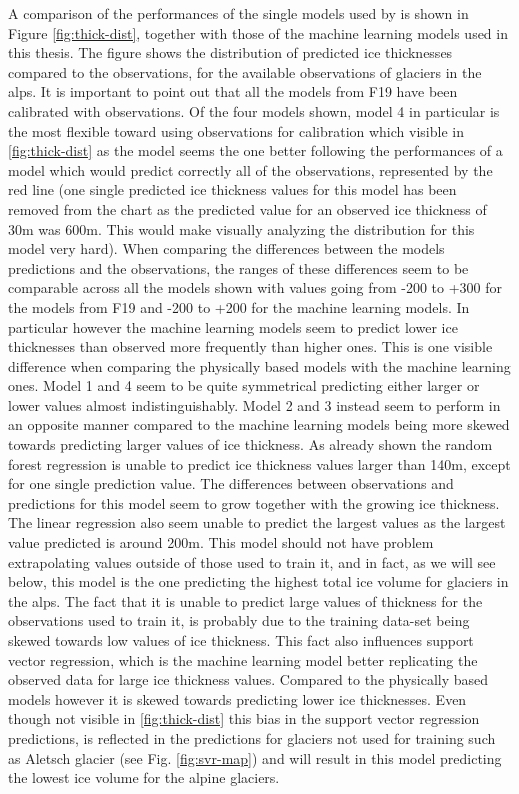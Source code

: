A comparison of the performances of the single models used by \citet{Farinotti2019} is shown in Figure \ref{fig:thick-dist}, together with those of the machine learning models used in this thesis. The figure shows the distribution of predicted ice thicknesses compared to the observations, for the available observations of glaciers in the alps. It is important to point out that all the models from F19 have been calibrated with observations. Of the four models shown, model 4 in particular is the most flexible toward using observations for calibration which visible in \ref{fig:thick-dist} as the model seems the one better following the performances of a model which would predict correctly all of the observations, represented by the red line (one single predicted ice thickness values for this model has been removed from the chart as the predicted value for an observed ice thickness of 30m was 600m. This would make visually analyzing the distribution for this model very hard). When comparing the differences between the models predictions and the observations, the ranges of these differences seem to be comparable across all the models shown with values going from -200 to +300 for the models from F19 and -200 to +200 for the machine learning models. In particular however the machine learning models seem to predict lower ice thicknesses than observed more frequently than higher ones. This is one visible difference when comparing the physically based models with the machine learning ones. Model 1 and 4 seem to be quite symmetrical predicting either larger or lower values almost indistinguishably. Model 2 and 3 instead seem to perform in an opposite manner compared to the machine learning models being more skewed towards predicting larger values of ice thickness. As already shown the random forest regression is unable to predict ice thickness values larger than 140m, except for one single prediction value. The differences between observations and predictions for this model seem to grow together with the growing ice thickness. The linear regression also seem unable to predict the largest values as the largest value predicted is around 200m. This model should not have problem extrapolating values outside of those used to train it, and in fact, as we will see below, this model is the one predicting the highest total ice volume for glaciers in the alps. The fact that it is unable to predict large values of thickness for the observations used to train it, is probably due to the training data-set being skewed towards low values of ice thickness. This fact also influences support vector regression, which is the machine learning model better replicating the observed data for large ice thickness values. Compared to the physically based models however it is skewed towards predicting lower ice thicknesses. Even though not visible in \ref{fig:thick-dist} this bias in the support vector regression predictions, is reflected in the predictions for glaciers not used for training such as Aletsch glacier (see Fig. \ref{fig:svr-map}) and will result in this model predicting the lowest ice volume for the alpine glaciers.

